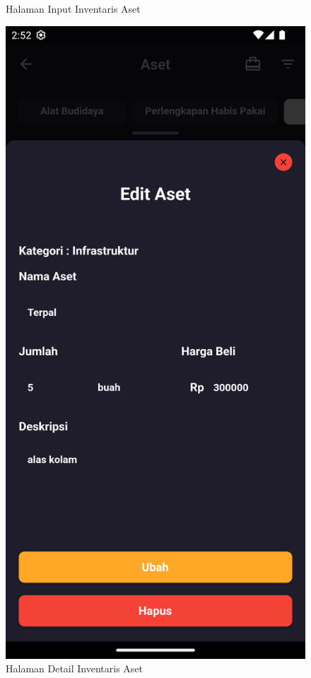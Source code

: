 \begin{spacing}{1.5}
\begin{enumerate}
\begin{enumerate}
\begin{itemize}
\begin{figure}[H]
						\caption{Halaman Input Inventaris Aset}
					\endminipage\hfill
						\includegraphics[width=\linewidth]{gambar/sprint4/as_3.png}
						\caption{Halaman Detail Inventaris Aset}
					\endminipage\hfill
				\end{figure}


\end{itemize}
\end{enumerate}
\end{enumerate}
\end{spacing}
